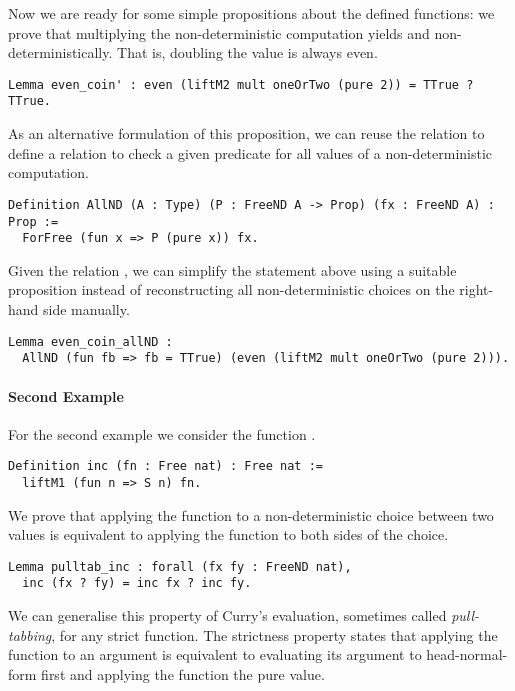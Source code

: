Now we are ready for some simple propositions about the defined functions: we prove that multiplying the non-deterministic computation  yields  and  non-deterministically.
That is, doubling the value  is always even.

\begin{verbatim}
Lemma even_coin' : even (liftM2 mult oneOrTwo (pure 2)) = TTrue ? TTrue.
\end{verbatim}

As an alternative formulation of this proposition, we can reuse the relation  to define a relation  to check a given predicate for all values of a non-deterministic computation.

\begin{verbatim}
Definition AllND (A : Type) (P : FreeND A -> Prop) (fx : FreeND A) : Prop :=
  ForFree (fun x => P (pure x)) fx.
\end{verbatim}

Given the relation , we can simplify the statement above using a suitable proposition instead of reconstructing all non-deterministic choices on the right-hand side manually.

\begin{verbatim}
Lemma even_coin_allND :
  AllND (fun fb => fb = TTrue) (even (liftM2 mult oneOrTwo (pure 2))).
\end{verbatim}

\paragraph{Second Example}
For the second example we consider the function .

\begin{verbatim}
Definition inc (fn : Free nat) : Free nat :=
  liftM1 (fun n => S n) fn.
\end{verbatim}

We prove that applying the function  to a non-deterministic choice between two values is equivalent to applying the function to both sides of the choice.

\begin{verbatim}
Lemma pulltab_inc : forall (fx fy : FreeND nat),
  inc (fx ? fy) = inc fx ? inc fy.
\end{verbatim}

We can generalise this property of Curry's evaluation, sometimes called \emph{pull-tabbing}, for any strict function.
The strictness property states that applying the function to an argument is equivalent to evaluating its argument to head-normal-form first and applying the function the pure value.

